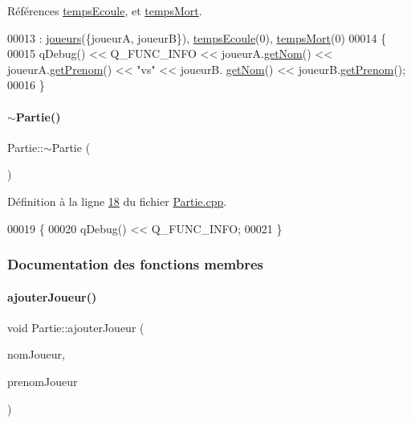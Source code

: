 Références \hyperlink{_partie_8h_source_l00020}{temps\+Ecoule}, et \hyperlink{_partie_8h_source_l00021}{temps\+Mort}.


\begin{DoxyCode}
00013                                              : \hyperlink{class_partie_a98fa2810599b3eb46d57df2b5836a3f4}{joueurs}(\{joueurA, joueurB\}), 
      \hyperlink{class_partie_a58664212ddb4954a59298f1de8256477}{tempsEcoule}(0), \hyperlink{class_partie_a55a5e6e0b757d74fa9aceefa7228ead9}{tempsMort}(0)
00014 \{
00015     qDebug() << Q\_FUNC\_INFO << joueurA.\hyperlink{class_joueur_a1d7082ab1f926eae1bd6834e901751a7}{getNom}() << joueurA.\hyperlink{class_joueur_ade527085b285ce86ea9e369bc9959032}{getPrenom}() << \textcolor{stringliteral}{"vs"} << joueurB.
      \hyperlink{class_joueur_a1d7082ab1f926eae1bd6834e901751a7}{getNom}() << joueurB.\hyperlink{class_joueur_ade527085b285ce86ea9e369bc9959032}{getPrenom}();
00016 \}
\end{DoxyCode}
\mbox{\label{class_partie_ae4afeb7336bb84427272cfb7018b5e3d}} 
\paragraph{\texorpdfstring{$\sim$\+Partie()}{~Partie()}}
{\footnotesize\ttfamily Partie\+::$\sim$\+Partie (\begin{DoxyParamCaption}{ }\end{DoxyParamCaption})}



Définition à la ligne \hyperlink{_partie_8cpp_source_l00018}{18} du fichier \hyperlink{_partie_8cpp_source}{Partie.\+cpp}.


\begin{DoxyCode}
00019 \{
00020     qDebug() << Q\_FUNC\_INFO;
00021 \}
\end{DoxyCode}


\subsubsection{Documentation des fonctions membres}
\mbox{\label{class_partie_ab9900d3b66d9ac7eabc837c790faa6b8}} 
\paragraph{\texorpdfstring{ajouter\+Joueur()}{ajouterJoueur()}}
{\footnotesize\ttfamily void Partie\+::ajouter\+Joueur (\begin{DoxyParamCaption}\item[{Q\+String \&}]{nom\+Joueur,  }\item[{Q\+String \&}]{prenom\+Joueur }\end{DoxyParamCaption})}



